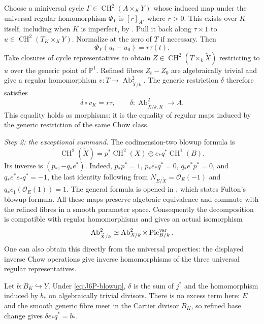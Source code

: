 Choose a miniversal cycle
$\Gamma\in\operatorname{CH}^2(A\times_KY)$ whose induced map
under the universal regular homomorphism $\Phi_Y$ is $[r]_A$,
where $r>0$. This exists over $K$ itself, including when $K$ is
imperfect, by \cite[Lemma 4.7, pp.~18--19]{DGJ_ACMVFunctor}.
Pull it back along $\tau\times1$ to
$u\in\operatorname{CH}^2(T_K\times_KY)$. Normalize at the zero
of $T$ if necessary. Then
\[
 \Phi_Y(u_t-u_0)=r\tau(t).
\]
Take closures of cycle representatives to obtain
$Z\in\operatorname{CH}^2(T\times_k\widetilde X)$ restricting
to $u$ over the generic point of $\mathbb P^1$. Refined fibres
$Z_t-Z_0$ are algebraically trivial and give a regular
homomorphism $v:T\to\operatorname{Ab}^2_{\widetilde X/k}$.
The generic restriction $\delta$ therefore satisfies
\begin{equation}\label{eq:J6P-spread}
 \delta\circ v_K=r\tau,
 \qquad
 \delta:\operatorname{Ab}^2_{\widetilde X/k,K}\longrightarrow A.
\end{equation}
This equality holds as morphisms: it is the equality of regular
maps induced by the generic restriction of the same Chow class.

\emph{Step 2: the exceptional summand.}
The codimension-two blowup formula is
\[
 \operatorname{CH}^2(\widetilde X)
 =p^*\operatorname{CH}^2(X)\oplus e_*q^*\operatorname{CH}^1(B).
\]
Its inverse is $(p_*,-q_*e^*)$. Indeed,
$p_*p^*=1$, $p_*e_*q^*=0$, $q_*e^*p^*=0$, and
$q_*e^*e_*q^*=-1$, the last identity following from
$N_{E/\widetilde X}=\mathcal O_E(-1)$ and
$q_*c_1(\mathcal O_E(1))=1$. The general formula is opened in
\cite[Section 2.3, Theorem 2.8(3)]{DGJ_Jiang2023}, which states
Fulton's blowup formula. All these maps preserve algebraic
equivalence and commute with the refined fibres in a smooth
parameter space. Consequently the decomposition is compatible
with regular homomorphisms and gives an actual isomorphism
\begin{equation}\label{eq:J6P-blowup}
 \operatorname{Ab}^2_{\widetilde X/k}
 \simeq\operatorname{Ab}^2_{X/k}\times\operatorname{Pic}^{\rm var}_{B/k}.
\end{equation}
One can also obtain this directly from the universal properties:
the displayed inverse Chow operations give inverse homomorphisms
of the three universal regular representatives.

Let $b:B_K\hookrightarrow Y$. Under
\eqref{eq:J6P-blowup}, $\delta$ is the sum of $j^*$ and the
homomorphism induced by $b_*$ on algebraically trivial divisors.
There is no excess term here: $E$ and the smooth generic fibre
meet in the Cartier divisor $B_K$, so refined base change gives
$\delta e_*q^*=b_*$.

